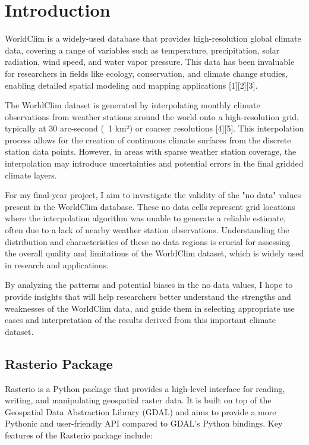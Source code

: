 \documentclass[a4paper,14pt] {report}
\begin{document}
	\chapter{Introduction}
	WorldClim is a widely-used database that provides high-resolution global climate data, covering a range of variables such as temperature, precipitation, solar radiation, wind speed, and water vapor pressure. This data has been invaluable for researchers in fields like ecology, conservation, and climate change studies, enabling detailed spatial modeling and mapping applications [1][2][3].
			
	The WorldClim dataset is generated by interpolating monthly climate observations from weather stations around the world onto a high-resolution grid, typically at 30 arc-second (~1 km²) or coarser resolutions [4][5]. This interpolation process allows for the creation of continuous climate surfaces from the discrete station data points. However, in areas with sparse weather station coverage, the interpolation may introduce uncertainties and potential errors in the final gridded climate layers.
			
	For my final-year project, I aim to investigate the validity of the "no data" values present in the WorldClim database. These no data cells represent grid locations where the interpolation algorithm was unable to generate a reliable estimate, often due to a lack of nearby weather station observations. Understanding the distribution and characteristics of these no data regions is crucial for assessing the overall quality and limitations of the WorldClim dataset, which is widely used in research and applications.
			
	By analyzing the patterns and potential biases in the no data values, I hope to provide insights that will help researchers better understand the strengths and weaknesses of the WorldClim data, and guide them in selecting appropriate use cases and interpretation of the results derived from this important climate dataset.
		
	\section{Rasterio Package}
	Rasterio is a Python package that provides a high-level interface for reading, writing, and manipulating geospatial raster data. It is built on top of the Geospatial Data Abstraction Library (GDAL) and aims to provide a more Pythonic and user-friendly API compared to GDAL's Python bindings.
	Key features of the Rasterio package include:
	
\end{document}
